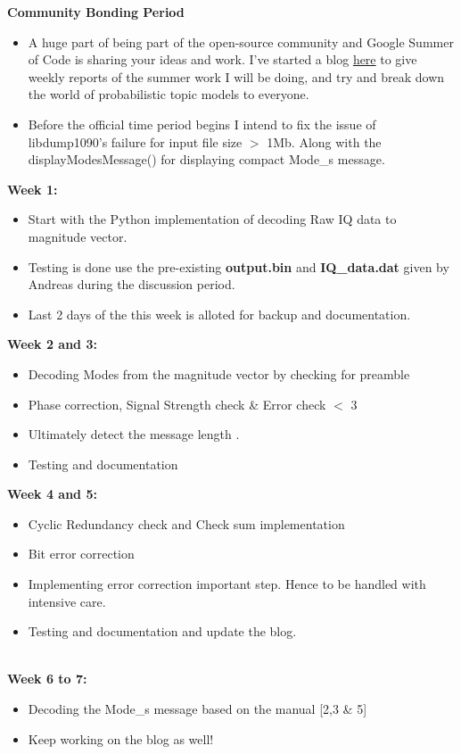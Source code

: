 \documentclass[11pt,a4paper]{report}
\begin{document}
\textbf{Community Bonding Period}
\begin{itemize}
\item A huge part of being part of the open-source community and Google Summer of Code is sharing your ideas and work. I've started a blog \href{https://valliappanca.wordpress.com/}{here} to give weekly reports of the summer work I will be doing, and try and break down the world of probabilistic topic models to everyone.
\item Before the official time period begins I intend to fix the issue of libdump1090's failure for input file size $> $ 1Mb. Along with the displayModesMessage() for displaying compact Mode\_s message.  


\end{itemize}
\textbf{Week 1:}
\begin{itemize}
\item Start with the Python implementation of decoding Raw IQ data to magnitude vector.
\item Testing is done use the pre-existing \textbf{output.bin} and \textbf{IQ\_data.dat} given by Andreas during the discussion period.
\item Last 2 days of the this week is alloted for backup and documentation.    
\end{itemize} 
\textbf{Week 2 and 3:}
\begin{itemize}
\item Decoding Modes from the magnitude vector by checking for preamble 
\item Phase correction, Signal Strength check \& Error check $<$ 3 
\item Ultimately detect the message length .
\item Testing and documentation
   
\end{itemize} 
\textbf{Week 4 and 5:}
\begin{itemize}
\item Cyclic Redundancy check and Check sum implementation 
\item Bit error correction 
\item Implementing error correction important step. Hence to be handled with intensive care.
\item Testing and documentation and update the blog.
   
\end{itemize} 
\textbf{\\Week 6 to 7:}
\begin{itemize}
\item Decoding the Mode\_s message based on the manual [2,3 \& 5] 
\item Keep working on the blog as well!
   
\end{itemize} 
\end{document}

